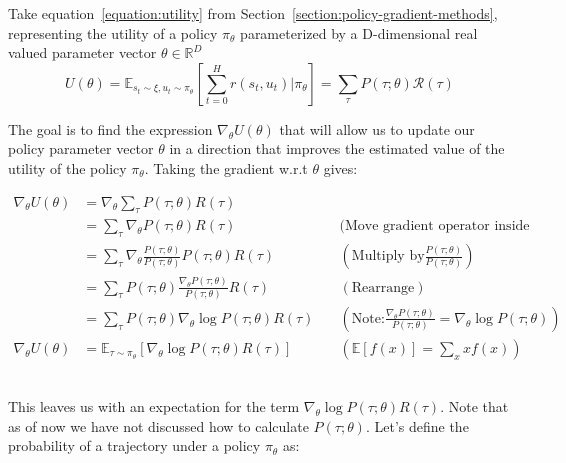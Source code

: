 \documentclass{../main.tex}{}
\begin{document}
Take equation~\ref{equation:utility} from Section~\ref{section:policy-gradient-methods}, representing the utility of a policy $\pi_{\theta}$ parameterized by a D-dimensional real valued parameter vector $\theta \in \mathbb{R}^D$
\begin{equation}\label{equation:utility}
U(\theta) = \mathbb{E}_{s_t \sim \xi, u_t \sim \pi_{\theta}}[\sum_{t=0}^{H}r(s_t, u_t) | \pi_{\theta}] = \sum_{\tau}P(\tau ; \theta)\mathcal{R}(\tau)
\end{equation}

The goal is to find the expression $\nabla_{\theta} U(\theta)$ that will allow us to update our policy parameter vector $\theta$ in a direction that improves the estimated value of the utility of the policy $\pi_{\theta}$. Taking the gradient w.r.t $\theta$ gives:

\begin{equation}\label{equation:expectance-gradient}
\begin{aligned}
\nabla_{\theta} U(\theta) & = \nabla_{\theta} \sum_{\tau}P(\tau ; \theta) R(\tau) \\
& =  \sum_{\tau} \nabla_{\theta} P(\tau ; \theta) R(\tau) \quad &\text{(Move gradient operator inside sum)} \\
& =  \sum_{\tau} \nabla_{\theta} \frac{P(\tau; \theta)}{P(\tau ; \theta)} P(\tau ; \theta) R(\tau) \quad & (\text{Multiply by} \frac{P(\tau; \theta)}{P(\tau ; \theta)}  )  \\
& =  \sum_{\tau} P(\tau; \theta) \frac{\nabla_{\theta} P(\tau ; \theta)}{P(\tau ; \theta)} R(\tau) \quad & (\text{Rearrange}) \\
& =  \sum_{\tau} P(\tau; \theta) \nabla_{\theta} \log P(\tau ; \theta) R(\tau) \quad & (\text{Note:} \frac{\nabla_{\theta}P(\tau; \theta)}{P(\tau; \theta)} = \nabla_{\theta} \log P(\tau; \theta) ) \\
\nabla_{\theta} U(\theta) & = \mathbb{E}_{\tau \sim \pi_{\theta}} [\nabla_{\theta} \log P(\tau ; \theta) R(\tau)] & (\mathbb{E}[f(x)] = \sum_{x} xf(x))\\
\end{aligned}
\end{equation}

\begin{equation}
\end{equation}

This leaves us with an expectation for the term $\nabla_{\theta} \log P(\tau ; \theta) R(\tau)$. Note that as of now we have not discussed how to calculate $P(\tau ; \theta)$. Let's define the probability of a trajectory under a policy $\pi_{\theta}$ as: 
\end{document}

